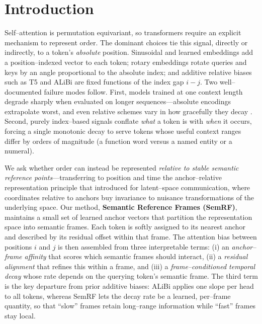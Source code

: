 \documentclass[11pt]{article}
\begin{document}
\section{Introduction}
\label{sec:intro}

Self--attention is permutation equivariant, so transformers require an explicit
mechanism to represent order. The dominant choices tie this signal, directly or
indirectly, to a token's \emph{absolute} position. Sinusoidal
\citep{vaswani2017attention} and learned \citep{radford2019language} embeddings
add a position--indexed vector to each token; rotary embeddings
\citep{su2021roformer} rotate queries and keys by an angle proportional to the
absolute index; and additive relative biases such as
T5 \citep{raffel2020exploring} and ALiBi \citep{press2022train} are fixed
functions of the index gap $i-j$. Two well--documented failure modes follow.
First, models trained at one context length degrade sharply when evaluated on
longer sequences---absolute encodings extrapolate worst, and even relative
schemes vary in how gracefully they decay \citep{press2022train,kazemnejad2023impact}.
Second, purely index--based signals conflate \emph{what} a token is with
\emph{when} it occurs, forcing a single monotonic decay to serve tokens whose
useful context ranges differ by orders of magnitude (a function word versus a
named entity or a numeral).

We ask whether order can instead be represented \emph{relative to stable
semantic reference points}---transferring to position and time the
anchor--relative representation principle that \citet{moschella2023relative}
introduced for latent--space communication, where coordinates relative to
anchors buy invariance to nuisance transformations of the underlying space. Our
method, \textbf{Semantic Reference Frames (SemRF)}, maintains a small set of
learned anchor vectors that partition the representation space into semantic
frames. Each token is softly assigned to its
nearest anchor and described by its residual offset within that frame. The
attention bias between positions $i$ and $j$ is then assembled from three
interpretable terms: (i) an \emph{anchor--frame affinity} that scores which
semantic frames should interact, (ii) a \emph{residual alignment} that refines
this within a frame, and (iii) a \emph{frame--conditioned temporal decay} whose
rate depends on the querying token's semantic frame. The third term is the key
departure from prior additive biases: ALiBi applies one slope per head to all
tokens, whereas SemRF lets the decay rate be a learned, per--frame quantity, so
that ``slow'' frames retain long--range information while ``fast'' frames stay
local.
\end{document}
